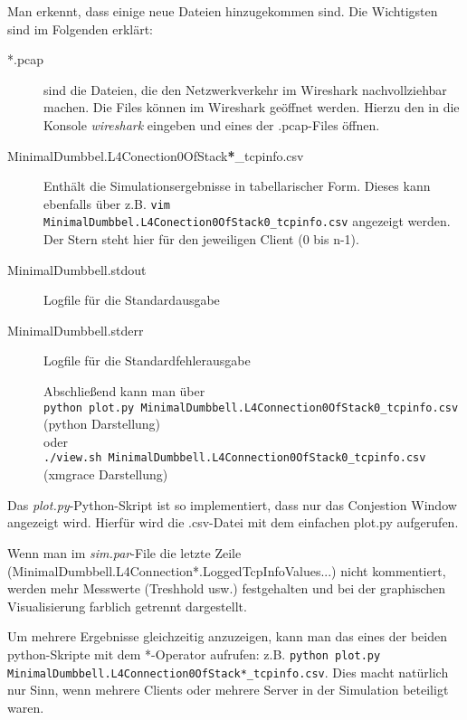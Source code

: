 \documentclass[11pt,div=14]{scrartcl}
\begin{document}
Man erkennt, dass einige neue Dateien hinzugekommen sind.
Die Wichtigsten sind im Folgenden erklärt: 
\begin{description}
\item[*.pcap] sind die Dateien, die den Netzwerkverkehr im Wireshark nachvollziehbar machen. Die Files können im Wireshark geöffnet werden. Hierzu den in die Konsole \textit{wireshark} eingeben und eines der .pcap-Files öffnen.

\item[MinimalDumbbel.L4Conection0OfStack\textbf{*}\_tcpinfo.csv] Enthält die Simulationsergebnisse in tabellarischer Form. Dieses kann ebenfalls über z.B.  \colorbox{lightred}{\lstinline$vim MinimalDumbbel.L4Conection0OfStack0_tcpinfo.csv$} angezeigt werden. Der Stern steht hier für den jeweiligen Client (0 bis n-1). 

\item[MinimalDumbbell.stdout] Logfile für die Standardausgabe
\item[MinimalDumbbell.stderr] Logfile für die Standardfehlerausgabe

Abschließend kann man über \\
\colorbox{lightred}{\lstinline$python plot.py MinimalDumbbell.L4Connection0OfStack0_tcpinfo.csv$} (python Darstellung)
\\oder\\
\colorbox{lightred}{\lstinline$./view.sh MinimalDumbbell.L4Connection0OfStack0_tcpinfo.csv$} (xmgrace Darstellung)
\end{description}

Das \textit{plot.py}-Python-Skript ist so implementiert, dass nur das Conjestion Window angezeigt wird. Hierfür wird die .csv-Datei mit dem einfachen plot.py aufgerufen.

Wenn man im \textit{sim.par}-File die letzte Zeile (MinimalDumbbell.L4Connection*.LoggedTcpInfoValues...) nicht kommentiert, werden mehr Messwerte (Treshhold usw.) festgehalten und bei der graphischen Visualisierung farblich getrennt dargestellt.

Um mehrere Ergebnisse gleichzeitig anzuzeigen, kann man das eines der beiden python-Skripte mit dem *-Operator aufrufen: z.B. \colorbox{lightred}{\lstinline$python plot.py MinimalDumbbell.L4Connection0OfStack*_tcpinfo.csv$}. Dies macht natürlich nur Sinn, wenn mehrere Clients oder mehrere Server in der Simulation beteiligt waren.
\end{document}
